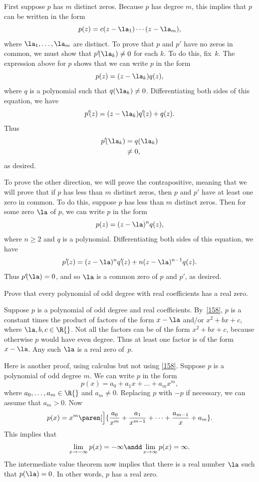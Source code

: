 \begin{Solution}
First suppose $p$ has $m$ distinct zeros.  Because $p$ has degree $m$, this
implies that $p$ can be written in the form
\[
p(z) = c (z - \la_1) \dotsm (z - \la_m),
\]
where $\la_1, \dots, \la_m$ are distinct.  To prove that $p$ and $p'$ have no
zeros in common, we must show that $p' \! (\la_k) \ne 0$ for each $k$.  To do this,
fix~$k$.  The expression above for $p$ shows that we can write $p$ in the form
\[
p(z) = (z - \la_k) q(z),
\]
where $q$ is a polynomial such that $q(\la_k) \ne 0$.  Differentiating both sides
of this equation, we have
\[
p' \! (z) = (z - \la_k) q' \! (z) + q(z).
\]
Thus
\begin{align*}
p' \! (\la_k) &= q(\la_k) \\
&\ne 0,
\end{align*}
as desired.

To prove the other direction, we will prove the contrapositive, meaning that we
will prove that if $p$ has less than $m$ distinct zeros, then $p$ and $p'$ have at
least one zero in common.  To do this, suppose $p$ has less than $m$ distinct
zeros.  Then for some zero $\la$ of $p$, we can write $p$ in the form
\[
p(z) = (z - \la)^n q(z),
\]
where $n \ge 2$ and $q$ is a polynomial.  Differentiating both sides
of this equation, we have
\[
p' \! (z) = (z - \la)^n q' \! (z) + n (z - \la)^{n-1} q(z).
\]
Thus $p' \! (\la) = 0$, and so $\la$ is a common zero of $p$ and $p'\!$, as desired.
\end{Solution}

\exercise
Prove that every polynomial of odd degree with real coefficients has a real zero.\label{4oddzero}

\begin{Solution}
Suppose $p$ is a polynomial of odd degree and real coefficients.
By~\ref{158}, $p$ is a constant times the product of factors of the form $x - \la$
and/or $x^2 + b x + c$, where $\la, b, c \in \R{}$.  Not all the
factors can be of the form $x^2 + b x + c$, because otherwise $p$ would
have even degree.  Thus at least one factor is of the form $x - \la$.  Any
such $\la$ is a real zero of~$p$.

\Comment
Here is another proof, using calculus but not using \ref{158}.  Suppose $p$ is a
polynomial of odd degree $m$.  We can write $p$ in the form
\[
p(x) = a_0 + a_1 x + \dots + a_m x^m,
\]
where $a_0, \dots, a_m \in \R{}$ and $a_m \ne 0$.  Replacing $p$ with $-p$ if
necessary, we can assume that $a_m > 0$.  Now
\[
p(x) = x^m \paren[\Big]{\frac{a_0}{x^m} + \frac{a_1}{x^{m-1}} + \dots
+ \frac{a_{m-1}}{x} + a_m}.
\]
This implies that
\[
\lim_{x \to -\infty} p(x) = -\infty \andd \lim_{x \to \infty} p(x) = \infty.
\]
The intermediate value theorem now implies that there is a real number $\la$ such
that $p(\la) = 0$.  In other words, $p$ has a real zero.
\end{Solution}

